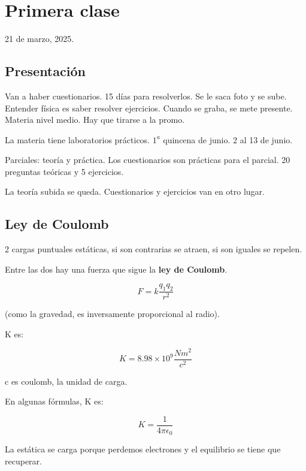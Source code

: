 \section{Primera clase}

21 de marzo, 2025.

\subsection{Presentación}

Van a haber cuestionarios.
15 días para resolverlos.
Se le saca foto y se sube.
Entender física es saber resolver ejercicios.
Cuando se graba, se mete presente.
Materia nivel medio.
Hay que tirarse a la promo.

La materia tiene laboratorios prácticos.
\(1^{a}\) quincena de junio.
2 al 13 de junio.

Parciales:
teoría y práctica.
Los cuestionarios son prácticas para el parcial.
20 preguntas teóricas y 5 ejercicios.

La teoría subida se queda.
Cuestionarios y ejercicios van en otro lugar.

\subsection{Ley de Coulomb}

2 cargas puntuales estáticas,
si son contrarias se atraen,
si son iguales se repelen.

Entre las dos hay una fuerza que sigue la \textbf{ley de Coulomb}.

\begin{equation}
    F= k \frac{q_{1}q_{2}}{r^{2}}
\end{equation}

(como la gravedad,
es inversamente proporcional al radio).

K es:

\begin{equation*}
    K= 8.98 \times 10^{9} \frac{Nm^{2}}{c^{2}}
\end{equation*}

c es coulomb,
la unidad de carga.

En algunas fórmulas, K es:

\begin{equation*}
    K = \frac{1}{4\pi\epsilon_{0}}
\end{equation*}

La estática se carga porque perdemos electrones y el equilibrio se tiene que recuperar.


